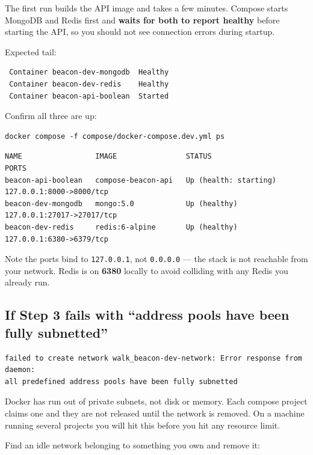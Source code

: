 \documentclass[
  10pt,
]{article}
\begin{document}
The first run builds the API image and takes a few minutes. Compose
starts MongoDB and Redis first and \textbf{waits for both to report
healthy} before starting the API, so you should not see connection
errors during startup.

Expected tail:

\begin{verbatim}
 Container beacon-dev-mongodb  Healthy
 Container beacon-dev-redis    Healthy
 Container beacon-api-boolean  Started
\end{verbatim}

Confirm all three are up:

\begin{verbatim}
docker compose -f compose/docker-compose.dev.yml ps
\end{verbatim}

\begin{verbatim}
NAME                 IMAGE                STATUS                    PORTS
beacon-api-boolean   compose-beacon-api   Up (health: starting)     127.0.0.1:8000->8000/tcp
beacon-dev-mongodb   mongo:5.0            Up (healthy)              127.0.0.1:27017->27017/tcp
beacon-dev-redis     redis:6-alpine       Up (healthy)              127.0.0.1:6380->6379/tcp
\end{verbatim}

Note the ports bind to \texttt{127.0.0.1}, not \texttt{0.0.0.0} --- the
stack is not reachable from your network. Redis is on \textbf{6380}
locally to avoid colliding with any Redis you already run.

\subsection{If Step 3 fails with ``address pools have been fully
subnetted''}\label{if-step-3-fails-with-address-pools-have-been-fully-subnetted}

\begin{verbatim}
failed to create network walk_beacon-dev-network: Error response from daemon:
all predefined address pools have been fully subnetted
\end{verbatim}

Docker has run out of private subnets, not disk or memory. Each compose
project claims one and they are not released until the network is
removed. On a machine running several projects you will hit this before
you hit any resource limit.

Find an idle network belonging to something you own and remove it:
\end{document}
